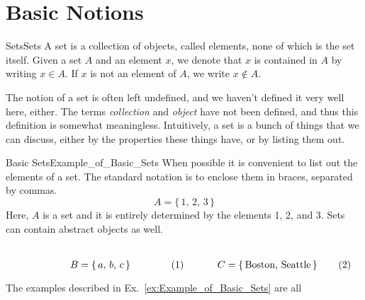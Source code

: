 \section{Basic Notions}
    \begin{fdefinition}{Sets}{Sets}
        A \gls{set} is a collection of objects, called elements, none of which
        is the set itself. Given a set $A$ and an element $x$, we denote that
        $x$ is contained in $A$ by writing $x\in{A}$. If $x$ is not an
        element of $A$, we write $x\notin{A}$.
    \end{fdefinition}
    The notion of a \textrm{set} is often left undefined, and we haven't
    defined it very well here, either. The terms \textit{collection} and
    \textit{object} have not been defined, and thus this definition is somewhat
    meaningless. Intuitively, a set is a bunch of things that we can discuss,
    either by the properties these things have, or by listing them out.
    \begin{fexample}{Basic Sets}{Example_of_Basic_Sets}
        When possible it is convenient to list out the elements of a set. The
        standard notation is to enclose them in braces, separated by commas.
        \begin{equation}
            A=\{\,1,\,2,\,3\,\}
        \end{equation}
        Here, $A$ is a set and it is entirely determined by the elements 1, 2,
        and 3. Sets can contain abstract objects as well.
        \par
        \begin{subequations}
            \begin{minipage}[b]{0.49\textwidth}
                \centering
                \begin{equation}
                    B=\{\,a,\,b,\,c\,\}
                \end{equation}
            \end{minipage}
            \hfill
            \begin{minipage}[b]{0.49\textwidth}
                \centering
                \begin{equation}
                    C=\{\,\textrm{Boston, Seattle}\,\}
                \end{equation}
            \end{minipage}
        \end{subequations}
    \end{fexample}
    The examples described in Ex.~\ref{ex:Example_of_Basic_Sets} are all
